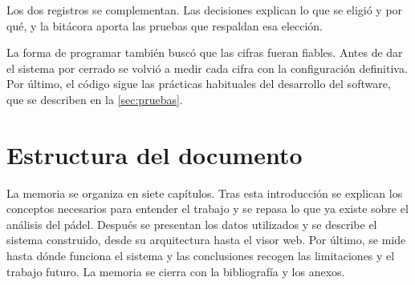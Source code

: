 Los dos registros se complementan.
Las decisiones explican lo que se eligió y por qué, y la bitácora aporta las pruebas que respaldan esa elección.

La forma de programar también buscó que las cifras fueran fiables.
Antes de dar el sistema por cerrado se volvió a medir cada cifra con la configuración definitiva.
Por último, el código sigue las prácticas habituales del desarrollo del software, que se describen en la \cref{sec:pruebas}.

\section{Estructura del documento}
\label{sec:estructura-documento}

La memoria se organiza en siete capítulos.
Tras esta introducción se explican los conceptos necesarios para entender el trabajo y se repasa lo que ya existe sobre el análisis del pádel.
Después se presentan los datos utilizados y se describe el sistema construido, desde su arquitectura hasta el visor web.
Por último, se mide hasta dónde funciona el sistema y las conclusiones recogen las limitaciones y el trabajo futuro.
La memoria se cierra con la bibliografía y los anexos.

